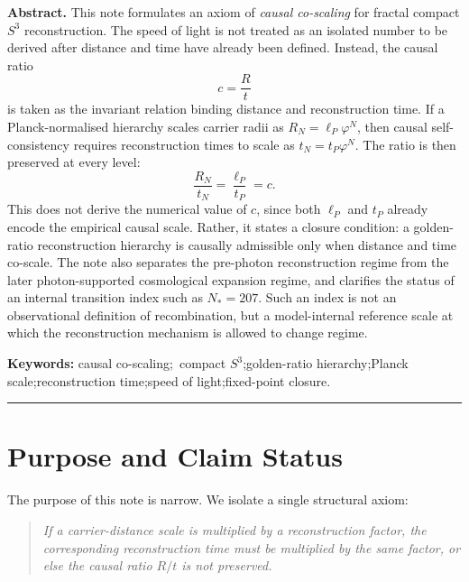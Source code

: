 \documentclass[11pt,a4paper]{article}
\newcommand{\Sthree}{S^{3}}
\newcommand{\lP}{\ell_{P}}
\newcommand{\tP}{t_{P}}
\newcommand{\ph}{\varphi}
\begin{document}
\begin{center}
\begin{minipage}{0.93\linewidth}
\textbf{Abstract.}\;
This note formulates an axiom of \emph{causal co-scaling} for fractal compact
$\Sthree$ reconstruction.  The speed of light is not treated as an isolated number
to be derived after distance and time have already been defined.  Instead, the causal
ratio
\[
  c=\frac{R}{t}
\]
is taken as the invariant relation binding distance and reconstruction time.  If a
Planck-normalised hierarchy scales carrier radii as $R_N=\lP\ph^N$, then causal
self-consistency requires reconstruction times to scale as $t_N=\tP\ph^N$.  The ratio
is then preserved at every level:
\[
  \frac{R_N}{t_N}=\frac{\lP}{\tP}=c.
\]
This does not derive the numerical value of $c$, since both $\lP$ and $\tP$ already
encode the empirical causal scale.  Rather, it states a closure condition: a
golden-ratio reconstruction hierarchy is causally admissible only when distance and
time co-scale.  The note also separates the pre-photon reconstruction regime from
the later photon-supported cosmological expansion regime, and clarifies the status
of an internal transition index such as $N_{\ast}=207$.  Such an index is not an
observational definition of recombination, but a model-internal reference scale at
which the reconstruction mechanism is allowed to change regime.

\smallskip
\noindent\textbf{Keywords:} causal co-scaling;\ compact $\Sthree$;\;golden-ratio
hierarchy;\;Planck scale;\;reconstruction time;\;speed of light;\;fixed-point closure.
\end{minipage}
\end{center}

\vspace{10pt}
{\color{ruleblue}\hrule}
\vspace{14pt}

\section{Purpose and Claim Status}

The purpose of this note is narrow.  We isolate a single structural axiom:

\begin{quote}
\emph{If a carrier-distance scale is multiplied by a reconstruction factor, the
corresponding reconstruction time must be multiplied by the same factor, or else
the causal ratio $R/t$ is not preserved.}
\end{quote}
\end{document}
